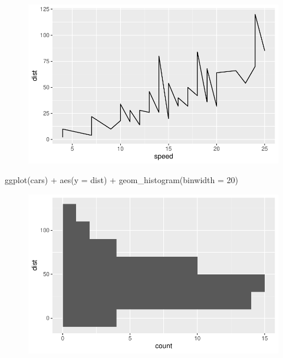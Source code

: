 \documentclass[
  letterpaper,
  DIV=11,
  numbers=noendperiod]{scrartcl}
\newenvironment{Shaded}{\begin{snugshade}}{\end{snugshade}}
\newcommand{\AttributeTok}[1]{\textcolor[rgb]{0.40,0.45,0.13}{#1}}
\newcommand{\DecValTok}[1]{\textcolor[rgb]{0.68,0.00,0.00}{#1}}
\newcommand{\FunctionTok}[1]{\textcolor[rgb]{0.28,0.35,0.67}{#1}}
\newcommand{\NormalTok}[1]{\textcolor[rgb]{0.00,0.23,0.31}{#1}}
\newcommand{\SpecialCharTok}[1]{\textcolor[rgb]{0.37,0.37,0.37}{#1}}
\begin{document}
\begin{figure}[H]

{\centering \includegraphics{class05_files/figure-pdf/unnamed-chunk-2-2.pdf}

}

\end{figure}

\begin{Shaded}
\begin{Highlighting}[]
\FunctionTok{ggplot}\NormalTok{(cars) }\SpecialCharTok{+} \FunctionTok{aes}\NormalTok{(}\AttributeTok{y =}\NormalTok{ dist) }\SpecialCharTok{+} \FunctionTok{geom\_histogram}\NormalTok{(}\AttributeTok{binwidth =} \DecValTok{20}\NormalTok{)}
\end{Highlighting}
\end{Shaded}

\begin{figure}[H]

{\centering \includegraphics{class05_files/figure-pdf/unnamed-chunk-2-3.pdf}

}

\end{figure}
\end{document}
